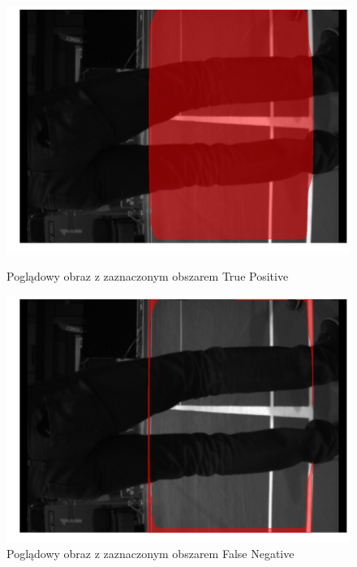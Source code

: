 \begin{figure}[!htb]
    \includegraphics[width=\linewidth]{TP_frame_9.jpg}
    \caption{Poglądowy obraz z zaznaczonym obszarem True Positive}
  \endminipage\hfill
    \includegraphics[width=\linewidth]{FN_frame_9.jpg}
    \caption{Poglądowy obraz z zaznaczonym obszarem False Negative}
  \endminipage\hfill
\end{figure}

